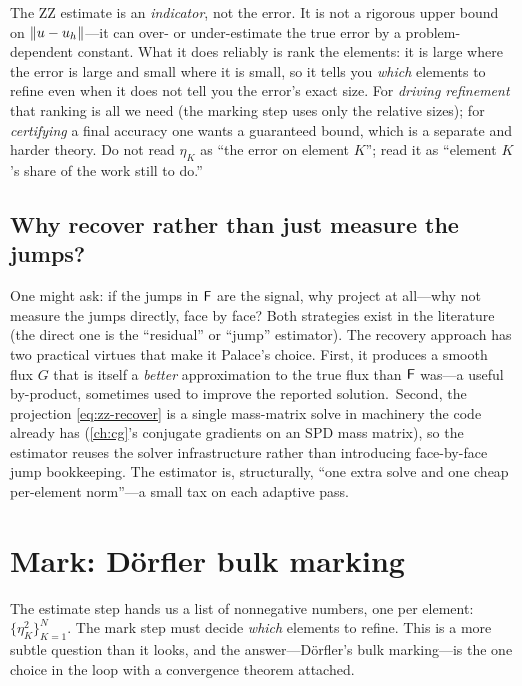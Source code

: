 \begin{pitfall}
The ZZ estimate is an \emph{indicator}, not the error. It is not a rigorous upper
bound on $\lVert u - u_h\rVert$---it can over- or under-estimate the true error by a
problem-dependent constant. What it does reliably is rank the elements: it is large
where the error is large and small where it is small, so it tells you \emph{which}
elements to refine even when it does not tell you the error's exact size. For
\emph{driving refinement} that ranking is all we need (the marking step uses only the
relative sizes); for \emph{certifying} a final accuracy one wants a guaranteed bound,
which is a separate and harder theory. Do not read $\eta_K$ as ``the error on element
$K$''; read it as ``element $K$'s share of the work still to do.''
\end{pitfall}

\subsection{Why recover rather than just measure the jumps?}

One might ask: if the jumps in $\mathsf{F}$ are the signal, why project at all---why not
measure the jumps directly, face by face? Both strategies exist in the literature
(the direct one is the ``residual'' or ``jump'' estimator). The recovery approach has
two practical virtues that make it Palace's choice. First, it produces a smooth flux
$G$ that is itself a \emph{better} approximation to the true flux than $\mathsf{F}$
was---a useful by-product, sometimes used to improve the reported solution.\ Second,
the projection \cref{eq:zz-recover} is a single mass-matrix solve in machinery the
code already has (\cref{ch:cg}'s conjugate gradients on an SPD mass matrix), so the
estimator reuses the solver infrastructure rather than introducing face-by-face jump
bookkeeping. The estimator is, structurally, ``one extra solve and one cheap
per-element norm''---a small tax on each adaptive pass.

\section{Mark: D\"orfler bulk marking}
\label{sec:mark}

The estimate step hands us a list of nonnegative numbers, one per element:
$\{\eta_K^2\}_{K=1}^{N}$. The mark step must decide \emph{which} elements to refine.
This is a more subtle question than it looks, and the answer---D\"orfler's bulk
marking---is the one choice in the loop with a convergence theorem attached.


